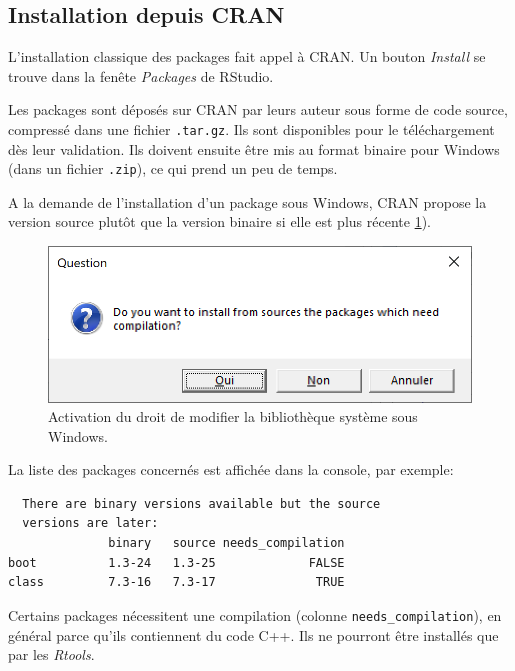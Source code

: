 \documentclass[
  11pt,
  french,
  a4paper,
  extrafontsizes,onecolumn,openright
  ]{memoir}
\begin{document}
\hypertarget{installation-depuis-cran}{%
\subsection{Installation depuis CRAN}\label{installation-depuis-cran}}

L'installation classique des packages fait appel à CRAN.
Un bouton \emph{Install} se trouve dans la fenête \emph{Packages} de RStudio.

Les packages sont déposés sur CRAN par leurs auteur sous forme de code source, compressé dans une fichier \texttt{.tar.gz}.
Ils sont disponibles pour le téléchargement dès leur validation.
Ils doivent ensuite être mis au format binaire pour Windows (dans un fichier \texttt{.zip}), ce qui prend un peu de temps.

A la demande de l'installation d'un package sous Windows, CRAN propose la version source plutôt que la version binaire si elle est plus récente \ref{fig:R-BinaryPkg}).



\scriptsize

\begin{figure}

{\centering \includegraphics[width=0.8\linewidth]{images/R-BinaryPkg} 

}

\caption{Activation du droit de modifier la bibliothèque système sous Windows.}\label{fig:R-BinaryPkg}
\end{figure}

\normalsize

La liste des packages concernés est affichée dans la console, par exemple:

\begin{verbatim}
  There are binary versions available but the source 
  versions are later:
              binary   source needs_compilation
boot          1.3-24   1.3-25             FALSE
class         7.3-16   7.3-17              TRUE
\end{verbatim}

Certains packages nécessitent une compilation (colonne \texttt{needs\_compilation}), en général parce qu'ils contiennent du code C++.
Ils ne pourront être installés que par les \emph{Rtools}.
\end{document}

